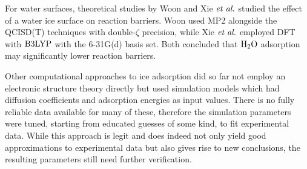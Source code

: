 \documentclass[8.5pt,twoside,twocolumn]{article}
\theoremstyle{standard}
\begin{document}
For water surfaces, theoretical studies by Woon\cite{Woon2002}
and Xie $\emph{et al.}$\cite{XieDingSun2006} studied the effect of a water ice surface
on reaction barriers. Woon used MP2 \cite{MP2} alongside the QCISD(T)
\cite{QCISD} techniques with double-$\zeta$ precision, while Xie $\emph{et al.}$
employed DFT with $\text{B3LYP}$ with the 6-31G(d) basis set. Both concluded that
$\text H _2 \text O$ adsorption may significantly lower reaction barriers.

Other computational approaches to ice adsorption did so far not employ an
electronic structure theory directly but used simulation models which had
diffusion coefficients and adsorption energies as input values. There is no
fully reliable data available for many of these, therefore the simulation
parameters were tuned, starting from educated guesses of some kind, to fit
experimental data. While this approach is legit and does indeed not only yield
good approximations to experimental data but also gives rise to new conclusions,
the resulting parameters still need further verification.
\end{document}
